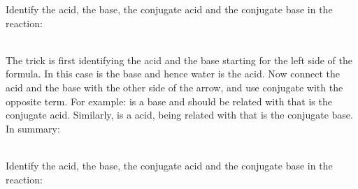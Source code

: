 \documentclass[main.tex]{subfiles}
\begin{document}
\begin{description}
\begin{example} %
Identify the acid, the base, the conjugate acid and the conjugate base in the reaction:
\begin{center}\end{center}
\\
The trick is first identifying the acid and the base starting for the left side of the formula. In this case  is the base and hence water is the acid. Now connect the acid and the base with the other side of the arrow, and use conjugate with the opposite term. For example:  is a base and should be related with  that is the conjugate acid. Similarly,  is a acid, being related with  that is the conjugate base. In summary:
\begin{center}\end{center}
\faDiamond\ \\
Identify the acid, the base, the conjugate acid and the conjugate base in the reaction:
\begin{center}\end{center}
\end{example}%



\end{description}
\end{document}
